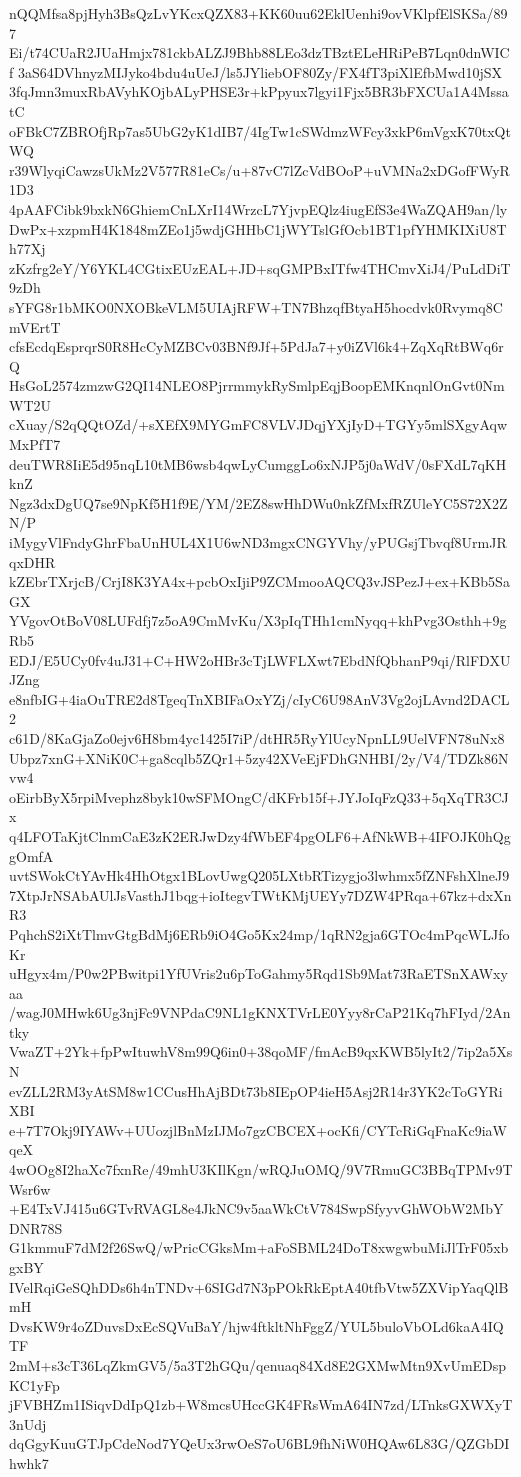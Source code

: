 nQQMfsa8pjHyh3BsQzLvYKcxQZX83+KK60uu62EklUenhi9ovVKlpfElSKSa/897
Ei/t74CUaR2JUaHmjx781ckbALZJ9Bhb88LEo3dzTBztELeHRiPeB7Lqn0dnWICf
3aS64DVhnyzMIJyko4bdu4uUeJ/ls5JYliebOF80Zy/FX4fT3piXlEfbMwd10jSX
3fqJmn3muxRbAVyhKOjbALyPHSE3r+kPpyux7lgyi1Fjx5BR3bFXCUa1A4MssatC
oFBkC7ZBROfjRp7as5UbG2yK1dIB7/4IgTw1cSWdmzWFcy3xkP6mVgxK70txQtWQ
r39WlyqiCawzsUkMz2V577R81eCs/u+87vC7lZcVdBOoP+uVMNa2xDGofFWyR1D3
4pAAFCibk9bxkN6GhiemCnLXrI14WrzcL7YjvpEQlz4iugEfS3e4WaZQAH9an/ly
DwPx+xzpmH4K1848mZEo1j5wdjGHHbC1jWYTslGfOcb1BT1pfYHMKIXiU8Th77Xj
zKzfrg2eY/Y6YKL4CGtixEUzEAL+JD+sqGMPBxITfw4THCmvXiJ4/PuLdDiT9zDh
sYFG8r1bMKO0NXOBkeVLM5UIAjRFW+TN7BhzqfBtyaH5hocdvk0Rvymq8CmVErtT
cfsEcdqEsprqrS0R8HcCyMZBCv03BNf9Jf+5PdJa7+y0iZVl6k4+ZqXqRtBWq6rQ
HsGoL2574zmzwG2QI14NLEO8PjrrmmykRySmlpEqjBoopEMKnqnlOnGvt0NmWT2U
cXuay/S2qQQtOZd/+sXEfX9MYGmFC8VLVJDqjYXjIyD+TGYy5mlSXgyAqwMxPfT7
deuTWR8IiE5d95nqL10tMB6wsb4qwLyCumggLo6xNJP5j0aWdV/0sFXdL7qKHknZ
Ngz3dxDgUQ7se9NpKf5H1f9E/YM/2EZ8swHhDWu0nkZfMxfRZUleYC5S72X2ZN/P
iMygyVlFndyGhrFbaUnHUL4X1U6wND3mgxCNGYVhy/yPUGsjTbvqf8UrmJRqxDHR
kZEbrTXrjcB/CrjI8K3YA4x+pcbOxIjiP9ZCMmooAQCQ3vJSPezJ+ex+KBb5SaGX
YVgovOtBoV08LUFdfj7z5oA9CmMvKu/X3pIqTHh1cmNyqq+khPvg3Osthh+9gRb5
EDJ/E5UCy0fv4uJ31+C+HW2oHBr3cTjLWFLXwt7EbdNfQbhanP9qi/RlFDXUJZng
e8nfbIG+4iaOuTRE2d8TgeqTnXBIFaOxYZj/cIyC6U98AnV3Vg2ojLAvnd2DACL2
c61D/8KaGjaZo0ejv6H8bm4yc1425I7iP/dtHR5RyYlUcyNpnLL9UelVFN78uNx8
Ubpz7xnG+XNiK0C+ga8cqlb5ZQr1+5zy42XVeEjFDhGNHBI/2y/V4/TDZk86Nvw4
oEirbByX5rpiMvephz8byk10wSFMOngC/dKFrb15f+JYJoIqFzQ33+5qXqTR3CJx
q4LFOTaKjtClnmCaE3zK2ERJwDzy4fWbEF4pgOLF6+AfNkWB+4IFOJK0hQggOmfA
uvtSWokCtYAvHk4HhOtgx1BLovUwgQ205LXtbRTizygjo3lwhmx5fZNFshXlneJ9
7XtpJrNSAbAUlJsVasthJ1bqg+ioItegvTWtKMjUEYy7DZW4PRqa+67kz+dxXnR3
PqhchS2iXtTlmvGtgBdMj6ERb9iO4Go5Kx24mp/1qRN2gja6GTOc4mPqcWLJfoKr
uHgyx4m/P0w2PBwitpi1YfUVris2u6pToGahmy5Rqd1Sb9Mat73RaETSnXAWxyaa
/wagJ0MHwk6Ug3njFc9VNPdaC9NL1gKNXTVrLE0Yyy8rCaP21Kq7hFIyd/2Antky
VwaZT+2Yk+fpPwItuwhV8m99Q6in0+38qoMF/fmAcB9qxKWB5lyIt2/7ip2a5XsN
evZLL2RM3yAtSM8w1CCusHhAjBDt73b8IEpOP4ieH5Asj2R14r3YK2cToGYRiXBI
e+7T7Okj9IYAWv+UUozjlBnMzIJMo7gzCBCEX+ocKfi/CYTcRiGqFnaKc9iaWqeX
4wOOg8I2haXc7fxnRe/49mhU3KIlKgn/wRQJuOMQ/9V7RmuGC3BBqTPMv9TWsr6w
+E4TxVJ415u6GTvRVAGL8e4JkNC9v5aaWkCtV784SwpSfyyvGhWObW2MbYDNR78S
G1kmmuF7dM2f26SwQ/wPricCGksMm+aFoSBML24DoT8xwgwbuMiJlTrF05xbgxBY
IVelRqiGeSQhDDs6h4nTNDv+6SIGd7N3pPOkRkEptA40tfbVtw5ZXVipYaqQlBmH
DvsKW9r4oZDuvsDxEcSQVuBaY/hjw4ftkltNhFggZ/YUL5buloVbOLd6kaA4IQTF
2mM+s3cT36LqZkmGV5/5a3T2hGQu/qenuaq84Xd8E2GXMwMtn9XvUmEDspKC1yFp
jFVBHZm1ISiqvDdIpQ1zb+W8mcsUHccGK4FRsWmA64IN7zd/LTnksGXWXyT3nUdj
dqGgyKuuGTJpCdeNod7YQeUx3rwOeS7oU6BL9fhNiW0HQAw6L83G/QZGbDIhwhk7
